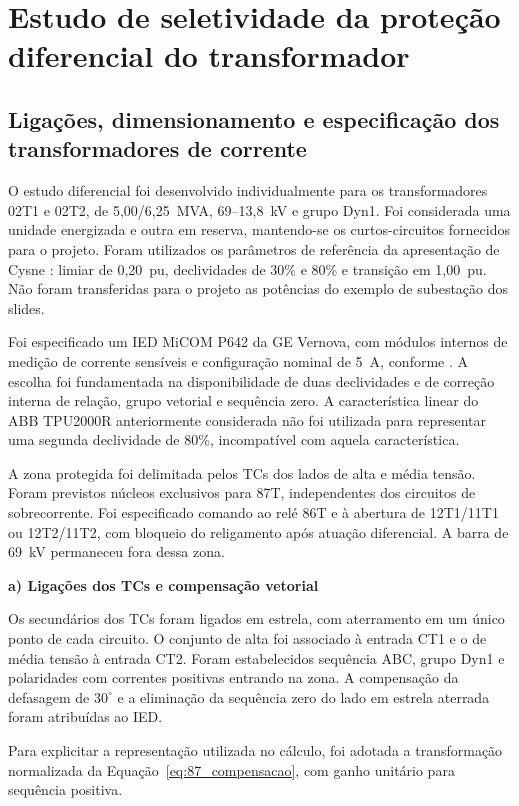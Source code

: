 \clearpage
\section{\textbf{Estudo de seletividade da proteção diferencial do transformador}}

\subsection{Ligações, dimensionamento e especificação dos transformadores de corrente}

O estudo diferencial foi desenvolvido individualmente para os transformadores 02T1 e 02T2, de 5,00/6,25~MVA, 69--13,8~kV e grupo Dyn1. Foi considerada uma unidade energizada e outra em reserva, mantendo-se os curtos-circuitos fornecidos para o projeto. Foram utilizados os parâmetros de referência da apresentação de Cysne \cite{cysne2026protecao}: limiar de 0,20~pu, declividades de 30\% e 80\% e transição em 1,00~pu. Não foram transferidas para o projeto as potências do exemplo de subestação dos slides.

Foi especificado um IED MiCOM P642 da GE Vernova, com módulos internos de medição de corrente sensíveis e configuração nominal de 5~A, conforme \cite{gev2025p64x}. A escolha foi fundamentada na disponibilidade de duas declividades e de correção interna de relação, grupo vetorial e sequência zero. A característica linear do ABB TPU2000R anteriormente considerada não foi utilizada para representar uma segunda declividade de 80\%, incompatível com aquela característica.

A zona protegida foi delimitada pelos TCs dos lados de alta e média tensão. Foram previstos núcleos exclusivos para 87T, independentes dos circuitos de sobrecorrente. Foi especificado comando ao relé 86T e à abertura de 12T1/11T1 ou 12T2/11T2, com bloqueio do religamento após atuação diferencial. A barra de 69~kV permaneceu fora dessa zona.

\textbf{a) Ligações dos TCs e compensação vetorial}

Os secundários dos TCs foram ligados em estrela, com aterramento em um único ponto de cada circuito. O conjunto de alta foi associado à entrada CT1 e o de média tensão à entrada CT2. Foram estabelecidos sequência ABC, grupo Dyn1 e polaridades com correntes positivas entrando na zona. A compensação da defasagem de $30^\circ$ e a eliminação da sequência zero do lado em estrela aterrada foram atribuídas ao IED.

Para explicitar a representação utilizada no cálculo, foi adotada a transformação normalizada da Equação~\eqref{eq:87_compensacao}, com ganho unitário para sequência positiva.

